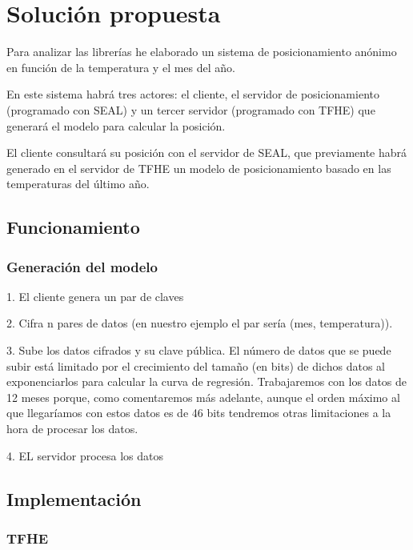\chapter{Solución propuesta}

Para analizar las librerías he elaborado un sistema de posicionamiento anónimo en función de la temperatura y el mes del año.

En este sistema habrá tres actores: el cliente, el servidor de posicionamiento (programado con SEAL) y un tercer servidor (programado con TFHE) que generará el modelo para calcular la posición.

El cliente consultará su posición con el servidor de SEAL, que previamente habrá generado en el servidor de TFHE un modelo de posicionamiento basado en las temperaturas del último año.


\section{Funcionamiento}


\subsection{Generación del modelo}

1. El cliente genera un par de claves

2. Cifra n pares de datos (en nuestro ejemplo el par sería (mes, temperatura)).

3. Sube los datos cifrados y su clave pública. El número de datos que se puede subir está limitado por el crecimiento del tamaño (en bits) de dichos datos al exponenciarlos para calcular la curva de regresión. Trabajaremos con los datos de 12 meses porque, como comentaremos más adelante, aunque el orden máximo al que llegaríamos con estos datos es de 46 bits tendremos otras limitaciones a la hora de procesar los datos.

4. EL servidor procesa los datos


\section{Implementación}

\subsection{TFHE}

